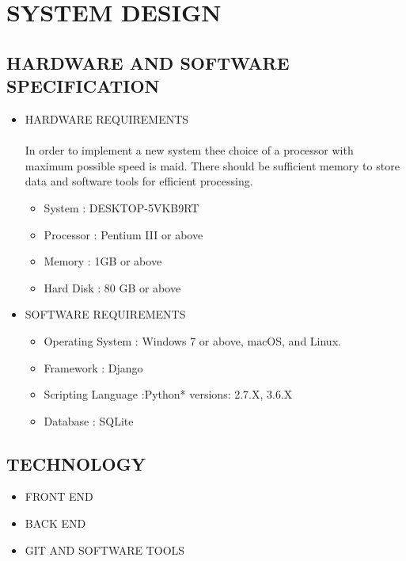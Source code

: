 \documentclass[a4paper, 12pt]{report}
\begin{document}
\section{SYSTEM DESIGN}


\subsection{HARDWARE AND SOFTWARE SPECIFICATION}
\begin{itemize}
\item HARDWARE REQUIREMENTS
\paragraph{}In order to implement a new system thee choice of a processor with maximum
possible speed is maid. There should be sufficient memory to store data and software tools
for efficient processing.
\begin{itemize}
\item System : DESKTOP-5VKB9RT
\item Processor : Pentium III or above
\item Memory : 1GB or above
\item Hard Disk : 80 GB or above
\end{itemize}

\item  SOFTWARE REQUIREMENTS
\begin{itemize}
\item Operating System : Windows 7 or above, macOS, and Linux.
\item Framework : Django
\item Scripting Language :Python* versions: 2.7.X, 3.6.X
\item Database : SQLite
\end{itemize}
\end{itemize}
\subsection{TECHNOLOGY}
\begin{itemize}
\item FRONT END
\item BACK END
\item GIT AND SOFTWARE TOOLS 
\end{itemize}
\end{document}

